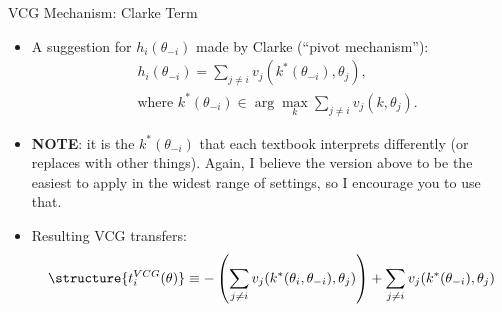 \documentclass[english,10pt
,aspectratio=169
]{beamer}
\begin{document}
\begin{frame}{VCG Mechanism: Clarke Term}
\begin{itemize}
	\item A suggestion for $h_i(\theta_{-i})$ made by Clarke (``pivot mechanism''):
	\vspace{-0.5em}\begin{align*}
	&h_{i}(\theta_{-i})=\sum_{j\neq i} v_{j}(k^*(\theta_{-i}),\theta_{j}),
	\\ &\text{where } k^*(\theta_{-i}) \in \arg\max_{k} \sum_{j\neq i}v_{j}(k,\theta_{j}).
	\end{align*}

	\item \textbf{NOTE}: it is the $k^*(\theta_{-i})$ that each textbook interprets differently (or replaces with other things). Again, I believe the version above to be the easiest to apply in the widest range of settings, so I encourage you to use that.
	
	\item Resulting \alert{VCG transfers}:
	\vspace{-0.5em}\begin{align*}
	\structure{ t_{i}^{VCG}(\theta) } \equiv -\left(\sum_{j\neq i} v_{j}(k^*(\theta_i, \theta_{-i}), \theta_{j}) \right) + \sum_{j\neq i} v_{j}(k^*(\theta_{-i}), \theta_{j})
	\end{align*}
\end{itemize}
\end{frame}
\end{document}
